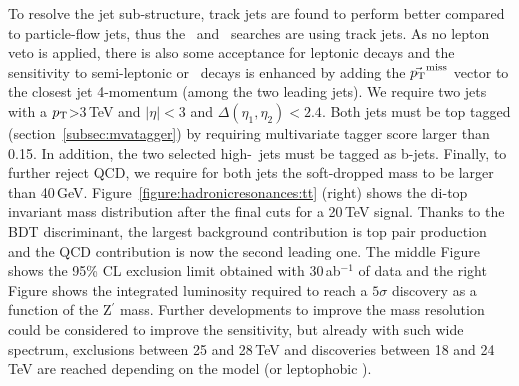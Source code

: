 \documentclass[a4paper,11pt]{article}
\begin{document}
To resolve the jet sub-structure, track jets are found to perform better compared to particle-flow jets, thus the \rsg\ and \Zptt\ searches are using track jets. As no lepton veto is applied, there is also some acceptance for leptonic decays and the sensitivity to semi-leptonic or \ttbar\ decays is enhanced by adding the $\vec{p_{\text{T}}}^{\textrm{miss}}$ vector to the closest jet 4-momentum (among the two leading jets).
We require two jets with a $p_{\text{T}}$>3\,TeV and $|\eta|<3$ and $\Delta(\eta_1,\eta_2)<2.4$. Both jets must be top tagged (section~\ref{subsec:mvatagger}) by requiring multivariate tagger score larger than 0.15. In addition, the two selected high-\pt\ jets must be tagged as b-jets. Finally, to further reject QCD, we require for both jets the soft-dropped mass to be larger than 40\,GeV. Figure~\ref{figure:hadronicresonances:tt} (right) shows the di-top invariant mass distribution after the final cuts for a 20\,TeV signal. Thanks to the BDT discriminant, the largest background contribution is top pair production and the QCD contribution is now the second leading one. The middle Figure shows the 95\% CL exclusion limit obtained with 30\,ab$^{-1}$ of data and the right Figure shows the integrated luminosity required to reach a $5\sigma$ discovery as a function of the Z$^\prime$ mass. Further developments to improve the mass resolution could be considered to improve the sensitivity, but already with such wide spectrum, exclusions between 25 and 28\,TeV and discoveries between 18 and 24\,TeV are reached depending on the model (\ZpSSM or leptophobic \ZpTC).
\end{document}
